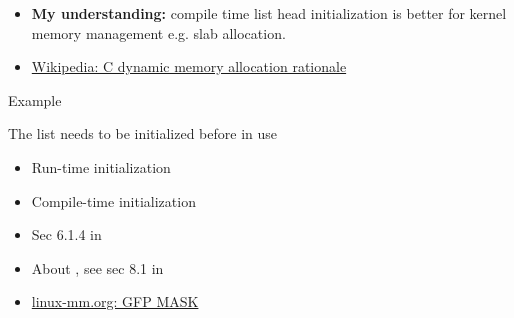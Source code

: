 \begin{description}
\begin{itemize}
\begin{quote}
      If you are statically declaring a , you should use
      , eg:
      \begin{center}
      \end{center}
    
      You should use  for a list head that is dynamically
      allocated, usually part of another structure. There are many examples in the kernel
      source.
    \end{quote}
  \item \textbf{My understanding:} compile time list head initialization is better for kernel
    memory management e.g. slab allocation.
  \item \href{http://en.wikipedia.org/wiki/C_dynamic_memory_allocation#Rationale}{Wikipedia: C
      dynamic memory allocation rationale}
  \end{itemize}
\end{description}

\begin{frame}{Example}
  \begin{center}
     
  \end{center}
  \begin{block}{The list needs to be initialized before in use}
    \begin{itemize}
    \item Run-time initialization
      \begin{center}
         
      \end{center}
    \item Compile-time initialization
      \begin{center}
         
      \end{center}
    \end{itemize}
  \end{block}
\end{frame}

\begin{itemize}
\item Sec 6.1.4 in \cite{love2010linux}
\item About , see sec 8.1 in \cite{corbet05ldd}
\item
  \href{http://linux-mm.org/PageAllocation#head-49144cba93f028bf6e50f5192b9d108badc2c5e8}{linux-mm.org:
    GFP MASK}
\end{itemize}

